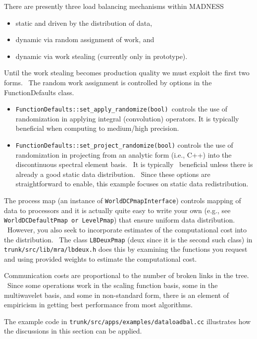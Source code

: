 \documentclass[letterpaper]{article}
\newcommand\liststyleLvi{%
\renewcommand\labelitemi{{\textbullet}}
\renewcommand\labelitemii{${\circ}$}
\renewcommand\labelitemiii{${\blacksquare}$}
\renewcommand\labelitemiv{{\textbullet}}
}
\newcommand\liststyleLvii{%
\renewcommand\labelitemi{{\textbullet}}
\renewcommand\labelitemii{${\circ}$}
\renewcommand\labelitemiii{${\blacksquare}$}
\renewcommand\labelitemiv{{\textbullet}}
}
\begin{document}
There are presently three load balancing mechanisms within MADNESS 

\liststyleLvi
\begin{itemize}
\item static and driven by the distribution of data, 
\item dynamic via random assignment of work, and 
\item dynamic via work stealing (currently only in prototype). 
\end{itemize}
Until the work stealing becomes production quality we must exploit the first two forms. \ The random work assignment is
controlled by options in the FunctionDefaults class. 

\liststyleLvii
\begin{itemize}
\item \texttt{FunctionDefaults::set\_apply\_randomize(bool) }controls the use of randomization in applying integral
(convolution) operators. It is typically beneficial when computing to medium/high precision. 
\item \texttt{FunctionDefaults::set\_project\_randomize(bool)} controls the use of randomization in projecting from an
analytic form (i.e., C++) into the discontinuous spectral element basis. \ It is typically \ beneficial unless there is
already a good static data distribution. \ Since these options are straightforward to enable, this example focuses on
static data redistribution. 
\end{itemize}
The process map (an instance of \texttt{WorldDCPmapInterface}) controls mapping of data to processors and it is actually
quite easy to write your own (e.g., see \texttt{WorldDCDefaultPmap }\texttt{or LevelPmap}) that ensure uniform data
distribution. \ However, you also seek to incorporate estimates of the computational cost into the distribution. \ The
class \texttt{LBDeuxPmap} (deux since it is the second such class) in \texttt{trunk/src/lib/mra/lbdeux.h} does this by
examining the functions you request and using provided weights to estimate the computational cost. 

Communication costs are proportional to the number of broken links in the tree. \ Since some operations work in the
scaling function basis, some in the multiwavelet basis, and some in non-standard form, there is an element of
empiricism in getting best performance from most algorithms. 

The example code in \texttt{trunk/src/apps/examples/dataloadbal.cc} illustrates how the discussions in this section can
be applied.
\end{document}

